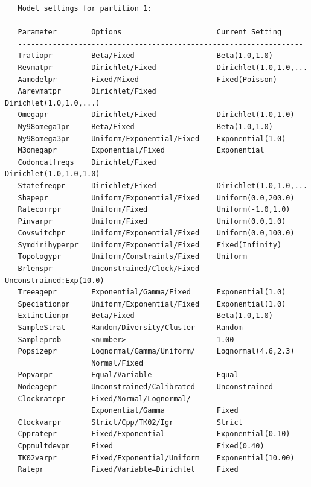 \documentclass[12pt]{book}
\begin{document}
\begin{singlespacing}
\small
\begin{verbatim}
   Model settings for partition 1:
 
   Parameter        Options                      Current Setting
   ------------------------------------------------------------------
   Tratiopr         Beta/Fixed                   Beta(1.0,1.0)
   Revmatpr         Dirichlet/Fixed              Dirichlet(1.0,1.0,...
   Aamodelpr        Fixed/Mixed                  Fixed(Poisson)
   Aarevmatpr       Dirichlet/Fixed              Dirichlet(1.0,1.0,...)
   Omegapr          Dirichlet/Fixed              Dirichlet(1.0,1.0)
   Ny98omega1pr     Beta/Fixed                   Beta(1.0,1.0)
   Ny98omega3pr     Uniform/Exponential/Fixed    Exponential(1.0)
   M3omegapr        Exponential/Fixed            Exponential
   Codoncatfreqs    Dirichlet/Fixed              Dirichlet(1.0,1.0,1.0)
   Statefreqpr      Dirichlet/Fixed              Dirichlet(1.0,1.0,...
   Shapepr          Uniform/Exponential/Fixed    Uniform(0.0,200.0)
   Ratecorrpr       Uniform/Fixed                Uniform(-1.0,1.0)
   Pinvarpr         Uniform/Fixed                Uniform(0.0,1.0)
   Covswitchpr      Uniform/Exponential/Fixed    Uniform(0.0,100.0)
   Symdirihyperpr   Uniform/Exponential/Fixed    Fixed(Infinity)
   Topologypr       Uniform/Constraints/Fixed    Uniform
   Brlenspr         Unconstrained/Clock/Fixed    Unconstrained:Exp(10.0)
   Treeagepr        Exponential/Gamma/Fixed      Exponential(1.0)
   Speciationpr     Uniform/Exponential/Fixed    Exponential(1.0)
   Extinctionpr     Beta/Fixed                   Beta(1.0,1.0)
   SampleStrat      Random/Diversity/Cluster     Random
   Sampleprob       <number>                     1.00
   Popsizepr        Lognormal/Gamma/Uniform/     Lognormal(4.6,2.3)
                    Normal/Fixed                   
   Popvarpr         Equal/Variable               Equal
   Nodeagepr        Unconstrained/Calibrated     Unconstrained
   Clockratepr      Fixed/Normal/Lognormal/
                    Exponential/Gamma            Fixed
   Clockvarpr       Strict/Cpp/TK02/Igr          Strict
   Cppratepr        Fixed/Exponential            Exponential(0.10)
   Cppmultdevpr     Fixed                        Fixed(0.40)
   TK02varpr        Fixed/Exponential/Uniform    Exponential(10.00)
   Ratepr           Fixed/Variable=Dirichlet     Fixed
   ------------------------------------------------------------------
\end{verbatim}
\normalsize
\end{singlespacing}
\end{document}
